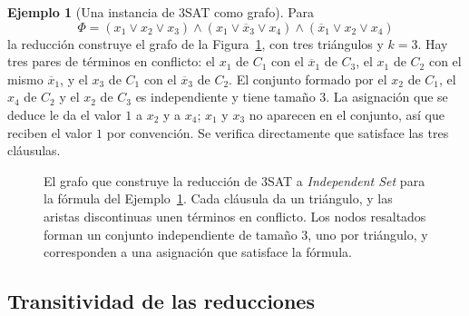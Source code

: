 \documentclass[12pt, spanish, oneside, openany]{book}
\newcommand{\prob}[1]{\textit{#1}}
\newcommand{\IS}{\prob{Independent Set}\xspace}
\newcommand{\nega}[1]{\overline{#1}} %
\theoremstyle{uprightplain}
\theoremstyle{definition}
\newtheorem{ejemplo}[teorema]{Ejemplo}
\theoremstyle{remark}
\theoremstyle{definition}
\begin{document}
\begin{ejemplo}[Una instancia de 3SAT como grafo]
\label{ej:np-3sat-is}
Para
\[
\Phi=(x_1\vee x_2\vee x_3)\wedge(x_1\vee\nega{x}_3\vee x_4)\wedge(\nega{x}_1\vee x_2\vee x_4)
\]
la reducción construye el grafo de la Figura~\ref{fig:np-3sat-is}, con tres triángulos y $k=3$. Hay tres pares de términos en conflicto: el $x_1$ de $C_1$ con el $\nega{x}_1$ de $C_3$, el $x_1$ de $C_2$ con el mismo $\nega{x}_1$, y el $x_3$ de $C_1$ con el $\nega{x}_3$ de $C_2$. El conjunto formado por el $x_2$ de $C_1$, el $x_4$ de $C_2$ y el $x_2$ de $C_3$ es independiente y tiene tamaño $3$. La asignación que se deduce le da el valor $1$ a $x_2$ y a $x_4$; $x_1$ y $x_3$ no aparecen en el conjunto, así que reciben el valor $1$ por convención. Se verifica directamente que satisface las tres cláusulas.
\end{ejemplo}

\begin{figure}[H]
\centering
{}
\caption{El grafo que construye la reducción de 3SAT a \IS para la fórmula del
Ejemplo~\ref{ej:np-3sat-is}. Cada cláusula da un triángulo, y las aristas
discontinuas unen términos en conflicto. Los nodos resaltados forman un
conjunto independiente de tamaño $3$, uno por triángulo, y corresponden a una
asignación que satisface la fórmula.}
\label{fig:np-3sat-is}
\end{figure}

\subsection{Transitividad de las reducciones}
\label{subsec:np-transitividad}
\end{document}
